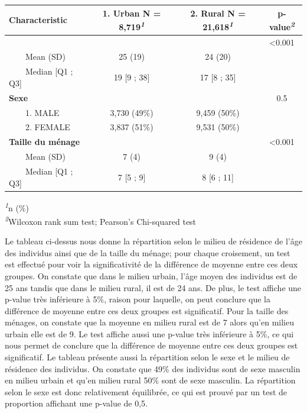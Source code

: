 \documentclass[
]{article}
\begin{document}
\begin{table}[t]
\fontsize{12.0pt}{14.0pt}\selectfont
\begin{tabular*}{\linewidth}{@{\extracolsep{\fill}}lccc}
\toprule
\textbf{Characteristic} & \textbf{1. Urban}  N = 8,719\textsuperscript{\textit{1}} & \textbf{2. Rural}  N = 21,618\textsuperscript{\textit{1}} & \textbf{p-value}\textsuperscript{\textit{2}} \\ 
\midrule\addlinespace[2.5pt]
{\bfseries Âge} &  &  & <0.001 \\ 
    Mean (SD) & 25 (19) & 24 (20) &  \\ 
    Median [Q1 ; Q3] & 19 [9 ; 38] & 17 [8 ; 35] &  \\ 
{\bfseries Sexe} &  &  & 0.5 \\ 
    1. MALE & 3,730 (49\%) & 9,459 (50\%) &  \\ 
    2. FEMALE & 3,837 (51\%) & 9,531 (50\%) &  \\ 
{\bfseries Taille du ménage} &  &  & <0.001 \\ 
    Mean (SD) & 7 (4) & 9 (4) &  \\ 
    Median [Q1 ; Q3] & 7 [5 ; 9] & 8 [6 ; 11] &  \\ 
\bottomrule
\end{tabular*}
\begin{minipage}{\linewidth}
\vspace{.05em}
\textsuperscript{\textit{1}}n (\%)\\
\textsuperscript{\textit{2}}Wilcoxon rank sum test; Pearson's Chi-squared test\\
\end{minipage}
\end{table}

Le tableau ci-dessus nous donne la répartition selon le milieu de
résidence de l'âge des individus ainsi que de la taille du ménage; pour
chaque croisement, un test est effectué pour voir la significativité de
la différence de moyenne entre ces deux groupes. On constate que dans le
milieu urbain, l'âge moyen des individus est de 25 ans tandis que dans
le milieu rural, il est de 24 ans. De plus, le test affiche une p-value
très inférieure à 5\%, raison pour laquelle, on peut conclure que la
différence de moyenne entre ces deux groupes est significatif. Pour la
taille des ménages, on constate que la moyenne en milieu rural est de 7
alors qu'en milieu urbain elle est de 9. Le test affiche aussi une
p-value très inférieure à 5\%, ce qui nous permet de conclure que la
différence de moyenne entre ces deux groupes est significatif. Le
tableau présente aussi la répartition selon le sexe et le milieu de
résidence des individus. On constate que 49\% des individus sont de sexe
masculin en milieu urbain et qu'en milieu rural 50\% sont de sexe
masculin. La répartition selon le sexe est donc relativement équilibrée,
ce qui est prouvé par un test de proportion affichant une p-value de
0,5.
\end{document}
